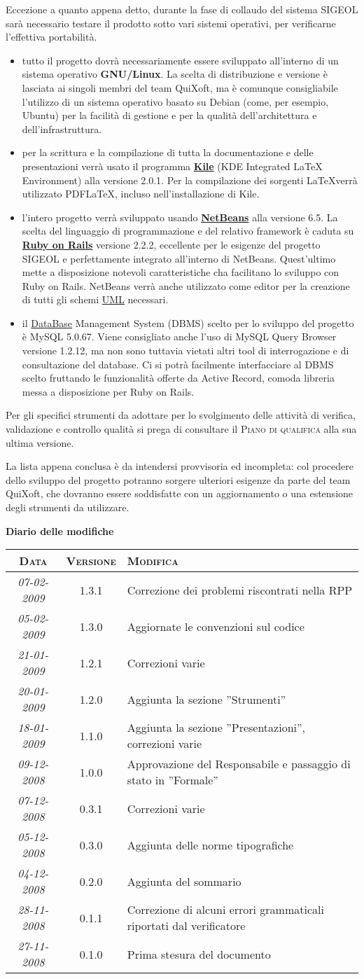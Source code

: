 \documentclass[11pt,a4paper]{article}
\newcommand{\modifiche} 
{
\newpage
\begin{center}
\textbf{Diario delle modifiche} \\
\bigskip
\begin{tabular}{|c|c|p{0.62\textwidth}|}
\hline
\textsc{Data} & \textsc{Versione} & \textsc{Modifica} \\
\hline
\hline
\textit{07-02-2009} & 1.3.1 & Correzione dei problemi riscontrati nella RPP\\
\hline
\textit{05-02-2009} & 1.3.0 & Aggiornate le convenzioni sul codice\\
\hline
\textit{21-01-2009} & 1.2.1 & Correzioni varie\\
\hline
\textit{20-01-2009} & 1.2.0 & Aggiunta la sezione ''Strumenti''\\
\hline
\textit{18-01-2009} & 1.1.0 & Aggiunta la sezione ''Presentazioni'', correzioni varie\\
\hline
\textit{09-12-2008} & 1.0.0 & Approvazione del Responsabile e passaggio di stato in ''Formale''\\
\hline
\textit{07-12-2008} & 0.3.1 & Correzioni varie \\
\hline
\textit{05-12-2008} & 0.3.0 & Aggiunta delle norme tipografiche \\
\hline
\textit{04-12-2008} & 0.2.0 & Aggiunta del sommario \\
\hline
\textit{28-11-2008} & 0.1.1 & Correzione di alcuni errori grammaticali riportati dal verificatore \\
\hline
\textit{27-11-2008} & 0.1.0 & Prima stesura del documento \\
\hline
\end{tabular}
\end{center}
}
\begin{document}
Eccezione a quanto appena detto, durante la fase di collaudo del sistema SIGEOL sarà necessario testare il prodotto sotto vari sistemi operativi, per verificarne l'effettiva portabilità.
\begin{itemize}
 \item tutto il progetto dovrà necessariamente essere sviluppato all'interno di un sistema operativo \textbf{GNU/Linux}. La scelta di distribuzione e versione è lasciata ai singoli membri del team QuiXoft, ma è comunque consigliabile l'utilizzo di un sistema operativo basato su Debian (come, per esempio, Ubuntu) per la facilità di gestione e per la qualità dell'architettura e dell'infrastruttura.
 \item per la scrittura e la compilazione di tutta la documentazione e delle presentazioni verrà usato il programma \textbf{\underline{Kile}} (KDE Integrated LaTeX Environment) alla versione 2.0.1. Per la compilazione dei sorgenti \LaTeX \space verrà utilizzato PDFLaTeX, incluso nell'installazione di Kile.
 \item l'intero progetto verrà sviluppato usando \textbf{\underline{NetBeans}} alla versione 6.5. La scelta del linguaggio di programmazione e del relativo framework è caduta su \textbf{\underline{Ruby on Rails}} versione 2.2.2, eccellente per le esigenze del progetto SIGEOL e perfettamente integrato all'interno di NetBeans. Quest'ultimo mette a disposizione notevoli caratteristiche cha facilitano lo sviluppo con Ruby on Rails.
NetBeans verrà anche utilizzato come editor per la creazione di tutti gli schemi \underline{UML} necessari.
\item il \underline{DataBase} Management System (DBMS) scelto per lo sviluppo del progetto è MySQL 5.0.67. Viene consigliato anche l'uso di MySQL Query Browser versione 1.2.12, ma non sono tuttavia vietati altri tool di interrogazione e di consultazione del database.
Ci si potrà facilmente interfacciare al DBMS scelto fruttando le funzionalità offerte da Active Record, comoda libreria messa a disposizione per Ruby on Rails.
\end{itemize}

Per gli specifici strumenti da adottare per lo svolgimento delle attività di verifica, validazione e controllo qualità si prega di consultare il \textsc{Piano di qualifica} alla sua ultima versione.

La lista appena conclusa è da intendersi provvisoria ed incompleta: col procedere dello sviluppo del progetto potranno sorgere ulteriori esigenze da parte del team QuiXoft, che dovranno essere soddisfatte con un aggiornamento o una estensione degli strumenti da utilizzare.


\modifiche
\end{document}
